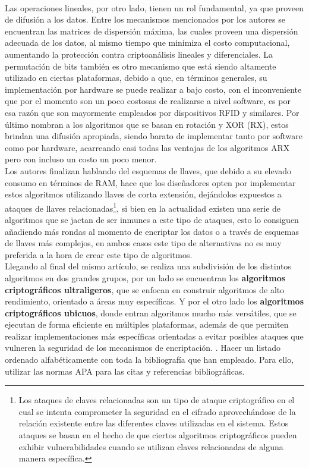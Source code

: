 \documentclass[]{article}
\begin{document}
\\ Las operaciones lineales, por otro lado, tienen un rol fundamental, ya que proveen de difusión a los datos. Entre los mecanismos mencionados por los autores se encuentran las matrices de dispersión máxima, las cuales proveen una dispersión adecuada de los datos, al mismo tiempo que minimiza el costo computacional, aumentando la protección contra criptoanálisis lineales y diferenciales. La permutación de bits también es otro mecanismo que está siendo altamente utilizado en ciertas plataformas, debido a que, en términos generales, su implementación por hardware se puede realizar a bajo costo, con el inconveniente que por el momento son un poco costosas de realizarse a nivel software, es por esa razón que son mayormente empleados por dispositivos RFID y similares. Por último nombran a los algoritmos que se basan en rotación y XOR (RX), estos brindan una difusión apropiada, siendo barato de implementar tanto por software como por hardware, acarreando casi todas las ventajas de los algoritmos ARX pero con incluso un costo un poco menor.
\\ Los autores finalizan hablando del esquemas de llaves, que debido a su elevado consumo en términos de RAM, hace que los diseñadores opten por implementar estos algoritmos utilizando llaves de corta extensión, dejándolos expuestos a ataques de llaves relacionadas\footnote{Los ataques de claves relacionadas son un tipo de ataque criptográfico en el cual se intenta comprometer la seguridad en el cifrado aprovechándose de la relación existente entre las diferentes claves utilizadas en el sistema. Estos ataques se basan en el hecho de que ciertos algoritmos criptográficos pueden exhibir vulnerabilidades cuando se utilizan claves relacionadas de alguna manera específica.}, si bien en la actualidad existen una serie de algoritmos que se jactan de ser inmunes a este tipo de ataques, esto lo consiguen añadiendo más rondas al momento de encriptar los datos o a través de esquemas de llaves más complejos, en ambos casos este tipo de alternativas no es muy preferida a la hora de crear este tipo de algoritmos.
\\Llegando al final del mismo artículo, se realiza una subdivisión de los distintos algoritmos en dos grandes grupos, por un lado se encuentran los \textbf{algoritmos criptográficos ultraligeros}, que se enfocan en construir algoritmos de alto rendimiento, orientado a áreas muy específicas. Y por el otro lado los \textbf{algoritmos criptográficos ubicuos}, donde entran algoritmos mucho más versátiles, que se ejecutan de forma eficiente en múltiples plataformas, además de que permiten realizar implementaciones más específicas orientadas a evitar posibles ataques que vulneren la seguridad de los mecanismos de encriptación.
\newline {}. Hacer un listado ordenado alfabéticamente con toda la bibliografía que han empleado. Para ello, utilizar las normas APA para las citas y referencias bibliográficas.
\nocite{*}
\printbibliography[heading=bibintoc]
\end{document}
